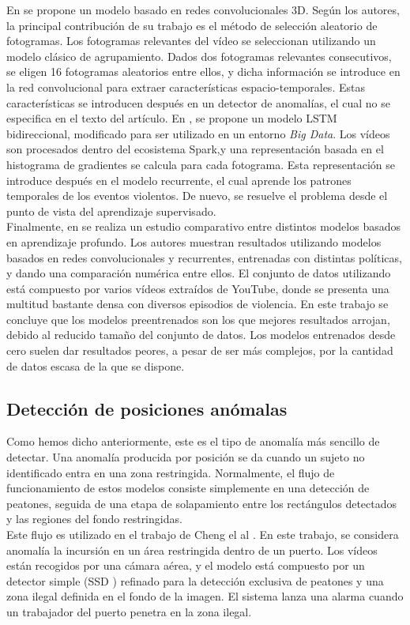 \documentclass[../main.tex]{memoir}
\begin{document}
En \cite{song2019novel} se propone un modelo basado en redes
convolucionales 3D. Según los autores, la principal contribución de su
trabajo es el método de selección aleatorio de fotogramas. Los
fotogramas relevantes del vídeo se seleccionan utilizando un modelo
clásico de agrupamiento. Dados dos fotogramas relevantes consecutivos,
se eligen 16 fotogramas aleatorios entre ellos, y dicha información se
introduce en la red convolucional para extraer características
espacio-temporales. Estas características se introducen después en un
detector de anomalías, el cual no se especifica en el texto del
artículo. En \cite{fenil2019real}, se propone un modelo LSTM
bidireccional, modificado para ser utilizado en un entorno \textit{Big
  Data}. Los vídeos son procesados dentro del ecosistema Spark,y
una representación basada en el histograma de gradientes se calcula
para cada fotograma. Esta representación se introduce después en el
modelo recurrente, el cual aprende los patrones temporales de los
eventos violentos. De nuevo, se resuelve el problema desde el punto
de vista del aprendizaje supervisado.\\

Finalmente, en \cite{sumon2019violent} se realiza un estudio
comparativo entre distintos modelos basados en aprendizaje
profundo. Los autores muestran resultados utilizando modelos basados
en redes convolucionales y recurrentes, entrenadas con distintas
políticas, y dando una comparación numérica entre ellos. El conjunto
de datos utilizando está compuesto por varios vídeos extraídos de
YouTube, donde se presenta una multitud bastante densa con diversos
episodios de violencia. En este trabajo se concluye que los modelos
preentrenados son los que mejores resultados arrojan, debido al
reducido tamaño del conjunto de datos. Los modelos entrenados desde
cero suelen dar resultados peores, a pesar de ser más complejos,
por la cantidad de datos escasa de la que se dispone.

\subsection{Detección de posiciones anómalas}
\label{sec:position-revision}

Como hemos dicho anteriormente, este es el tipo de anomalía más
sencillo de detectar. Una anomalía producida por posición se da cuando
un sujeto no identificado entra en una zona restringida. Normalmente,
el flujo de funcionamiento de estos modelos consiste simplemente en una
detección de peatones, seguida de una etapa de solapamiento entre los
rectángulos detectados y las regiones del fondo restringidas.\\

Este flujo es utilizado en el trabajo de Cheng el al
\cite{cheng2017abnormal}. En este trabajo, se considera anomalía la
incursión en un área restringida dentro de un puerto. Los vídeos están
recogidos por una cámara aérea, y el modelo está compuesto por un
detector simple (SSD \cite{liu2016ssd}) refinado para la detección
exclusiva de peatones y una zona ilegal definida en el fondo de la
imagen. El sistema lanza una alarma cuando un trabajador del puerto
penetra en la zona ilegal.
\end{document}
